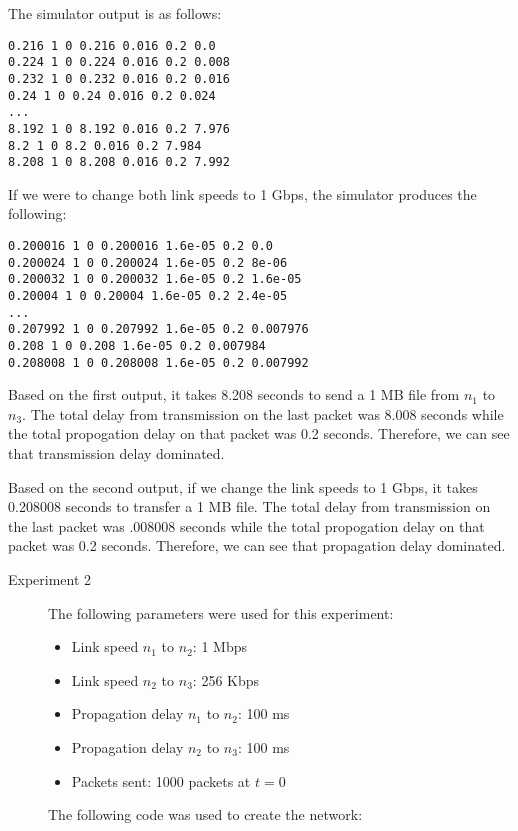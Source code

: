 \documentclass[11pt]{article}
\begin{document}
\begin{description}
\begin{description}
\begin{description}
The simulator output is as follows:

\begin{lstlisting}
0.216 1 0 0.216 0.016 0.2 0.0
0.224 1 0 0.224 0.016 0.2 0.008
0.232 1 0 0.232 0.016 0.2 0.016
0.24 1 0 0.24 0.016 0.2 0.024
...
8.192 1 0 8.192 0.016 0.2 7.976
8.2 1 0 8.2 0.016 0.2 7.984
8.208 1 0 8.208 0.016 0.2 7.992
\end{lstlisting}

If we were to change both link speeds to 1 Gbps, the simulator produces the following:

\begin{lstlisting}
0.200016 1 0 0.200016 1.6e-05 0.2 0.0
0.200024 1 0 0.200024 1.6e-05 0.2 8e-06
0.200032 1 0 0.200032 1.6e-05 0.2 1.6e-05
0.20004 1 0 0.20004 1.6e-05 0.2 2.4e-05
...
0.207992 1 0 0.207992 1.6e-05 0.2 0.007976
0.208 1 0 0.208 1.6e-05 0.2 0.007984
0.208008 1 0 0.208008 1.6e-05 0.2 0.007992
\end{lstlisting}

Based on the first output, it takes 8.208 seconds to send a 1 MB file from $n_1$ to $n_3$. The total delay from transmission on the last packet was 8.008 seconds while the total propogation delay on that packet was 0.2 seconds. Therefore, we can see that transmission delay dominated.

Based on the second output, if we change the link speeds to 1 Gbps, it takes 0.208008 seconds to transfer a 1 MB file. The total delay from transmission on the last packet was .008008 seconds while the total propogation delay on that packet was 0.2 seconds. Therefore, we can see that propagation delay dominated.

\begin{description}
\item[Experiment 2] \hfill \break
The following parameters were used for this experiment:

\begin{itemize}
\item Link speed $n_1$ to $n_2$: 1 Mbps
\item Link speed $n_2$ to $n_3$: 256 Kbps
\item Propagation delay $n_1$ to $n_2$: 100 ms
\item Propagation delay $n_2$ to $n_3$: 100 ms
\item Packets sent: 1000 packets at $t = 0$
\end{itemize}

\medskip

The following code was used to create the network:


\end{description}
\end{description}
\end{description}
\end{description}
\end{document}
